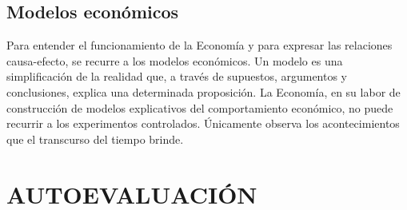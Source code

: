 \documentclass[12pt]{book}
\begin{document}
\section{Modelos económicos}
Para entender el funcionamiento de la Economía y para expresar las relaciones causa-efecto, se recurre a los modelos económicos. Un modelo es una simplificación de la realidad que, a través de supuestos, argumentos y conclusiones, explica una determinada
proposición. La Economía, en su labor de construcción de modelos explicativos del comportamiento económico, no puede recurrir a los experimentos controlados. Únicamente observa los acontecimientos que el transcurso del tiempo brinde.

\chapter{AUTOEVALUACIÓN}
\end{document}
